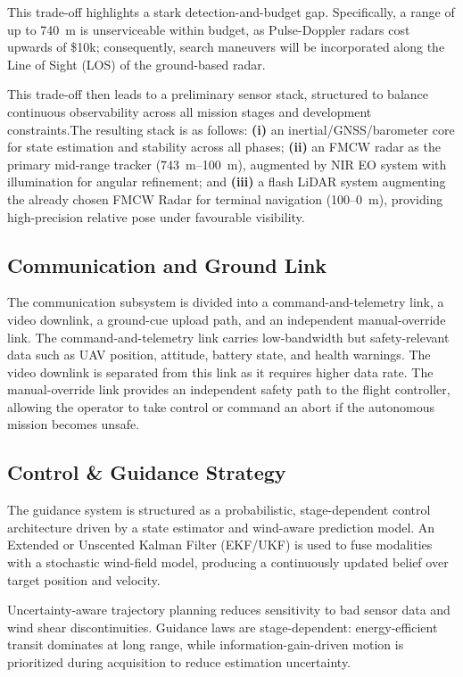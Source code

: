 This trade-off highlights a stark detection-and-budget gap. Specifically, a range of up to 740~m is unserviceable within budget, as Pulse-Doppler radars cost upwards of \$10k; consequently, search maneuvers will be incorporated along the Line of Sight (LOS) of the ground-based radar.


This trade-off then leads to a preliminary sensor stack, structured to balance continuous observability across all mission stages and development constraints.The resulting stack is as follows: \textbf{(i)} an inertial/GNSS/barometer core for state estimation and stability across all phases; \textbf{(ii)} an FMCW radar as the primary mid-range tracker (743~m--100~m), augmented by NIR EO system with illumination for angular refinement;  and \textbf{(iii)} a flash LiDAR system augmenting the already chosen FMCW Radar for terminal navigation (100--0~m), providing high-precision relative pose under favourable visibility.




\subsection{Communication and Ground Link}
The communication subsystem is divided into a command-and-telemetry link, a video downlink, a ground-cue upload path, and an independent manual-override link. The command-and-telemetry link carries low-bandwidth but safety-relevant data such as UAV position, attitude, battery state, and health warnings. The video downlink is separated from this link as it requires higher data rate. The manual-override link provides an independent safety path to the flight controller, allowing the operator to take control or command an abort if the autonomous mission becomes unsafe.
\subsection{Control \& Guidance Strategy}

The guidance system is structured as a probabilistic, stage-dependent control architecture driven by a state estimator and wind-aware prediction model. An Extended or Unscented Kalman Filter (EKF/UKF) is used to fuse modalities with a stochastic wind-field model, producing a continuously updated belief over target position and velocity. 

Uncertainty-aware trajectory planning reduces sensitivity to bad sensor data and wind shear discontinuities. Guidance laws are stage-dependent: energy-efficient transit dominates at long range, while information-gain-driven motion is prioritized during acquisition to reduce estimation uncertainty.


